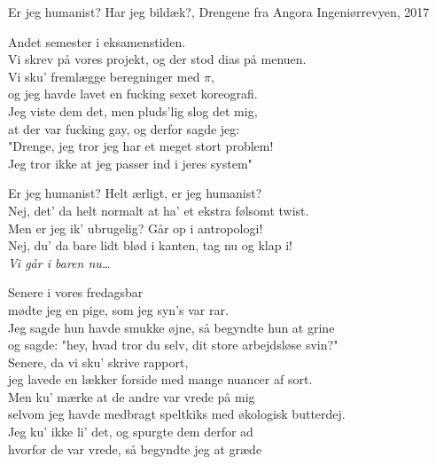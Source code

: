 \begin{song}{Er jeg humanist?}
  {} %
  {Har jeg bildæk?, Drengene fra Angora} %
  {} %
  {Ingeniørrevyen, 2017} %
  {\NotCCLIed} %

  \begin{SBVerse}
    Andet semester i eksamenstiden.\\
    Vi skrev på vores projekt, og der stod dias på menuen.\\
    Vi sku' fremlægge beregninger med $\pi$,\\
    og jeg havde lavet en fucking sexet koreografi.\\\medskip
    Jeg viste dem det, men pluds'lig slog det mig,\\
    at der var fucking gay, og derfor sagde jeg:\\
    "Drenge, jeg tror jeg har et meget stort problem!\\
    Jeg tror ikke at jeg passer ind i jeres system"
  \end{SBVerse}

  \begin{SBChorus}
    Er jeg humanist? Helt ærligt, er jeg humanist?\\
    Nej, det' da helt normalt at ha' et ekstra følsomt twist.\\
    Men er jeg ik' ubrugelig? Går op i antropologi!\\
    Nej, du' da bare lidt blød i kanten, tag nu og klap i!\\
    \emph{Vi går i baren nu\ldots}
  \end{SBChorus}

  \begin{SBVerse}
    Senere i vores fredagsbar\\
    mødte jeg en pige, som jeg syn's var rar.\\
    Jeg sagde hun havde smukke øjne, så begyndte hun at grine\\
    og sagde: "hey, hvad tror du selv, dit store arbejdsløse svin?"\\
    Senere, da vi sku' skrive rapport,\\
    jeg lavede en lækker forside med mange nuancer af sort.\\\medskip
    Men ku' mærke at de andre var vrede på mig\\
    selvom jeg havde medbragt speltkiks med økologisk butterdej.\\
    Jeg ku' ikke li' det, og spurgte dem derfor ad\\
    hvorfor de var vrede, så begyndte jeg at græde
  \end{SBVerse}


\end{song}
